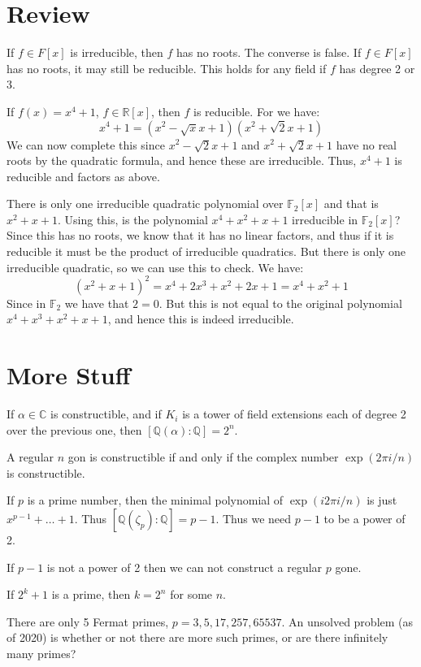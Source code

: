\section{Review}
    If $f\in{F}[x]$ is irreducible, then $f$ has no roots. The converse is
    false. If $f\in{F}[x]$ has no roots, it may still be reducible. This
    holds for any field if $f$ has degree 2 or 3.
    \begin{example}
        If $f(x)=x^{4}+1$, $f\in\mathbb{R}[x]$, then $f$ is reducible. For
        we have:
        \begin{equation}
            x^{4}+1=(x^{2}-\sqrt{x}x+1)(x^{2}+\sqrt{2}x+1)
        \end{equation}
        We can now complete this since $x^{2}-\sqrt{2}x+1$ and
        $x^{2}+\sqrt{2}x+1$ have no real roots by the quadratic formula,
        and hence these are irreducible. Thus, $x^{4}+1$ is reducible and
        factors as above.
    \end{example}
    \begin{example}
        There is only one irreducible quadratic polynomial over
        $\mathbb{F}_{2}[x]$ and that is $x^{2}+x+1$. Using this, is the
        polynomial $x^{4}+x^{2}+x+1$ irreducible in $\mathbb{F}_{2}[x]$?
        Since this has no roots, we know that it has no linear factors, and
        thus if it is reducible it must be the product of irreducible
        quadratics. But there is only one irreducible quadratic, so we can
        use this to check. We have:
        \begin{equation}
            (x^{2}+x+1)^{2}=
            x^{4}+2x^{3}+x^{2}+2x+1=x^{4}+x^{2}+1
        \end{equation}
        Since in $\mathbb{F}_{2}$ we have that $2=0$. But this is not equal
        to the original polynomial $x^{4}+x^{3}+x^{2}+x+1$, and hence
        this is indeed irreducible.
    \end{example}
\section{More Stuff}
    If $\alpha\in\mathbb{C}$ is constructible, and if
    $K_{i}$ is a tower of field extensions each of degree 2 over the
    previous one, then $[\mathbb{Q}(\alpha):\mathbb{Q}]=2^{n}$.
    \begin{theorem}
        A regular $n$ gon is constructible if and only if the complex number
        $\exp(2\pi{i}/n)$ is constructible.
    \end{theorem}
    If $p$ is a prime number, then the minimal polynomial of
    $\exp(i2\pi{i}/n)$ is just $x^{p-1}+\dots+1$. Thus
    $[\mathbb{Q}(\zeta_{p}):\mathbb{Q}]=p-1$. Thus we need $p-1$ to be a
    power of 2.
    \begin{theorem}
        If $p-1$ is not a power of 2 then we can not construct a regular
        $p$ gone.
    \end{theorem}
    \begin{theorem}
        If $2^{k}+1$ is a prime, then $k=2^{n}$ for some $n$.
    \end{theorem}
    There are only 5 Fermat primes, $p=3,5,17,257,65537$. An unsolved
    problem (as of 2020) is whether or not there are more such primes, or
    are there infinitely many primes? 
